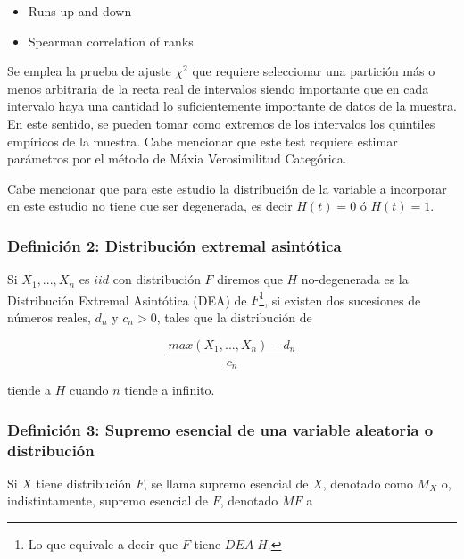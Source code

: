 \documentclass[
  12pt]{article}
\begin{document}
\begin{itemize}
\item  Runs up and down 
\item  Spearman correlation of ranks 
\end{itemize}

Se emplea la prueba de ajuste \(\chi^2\) que requiere seleccionar una
partición más o menos arbitraria de la recta real de intervalos siendo
importante que en cada intervalo haya una cantidad lo suficientemente
importante de datos de la muestra. En este sentido, se pueden tomar como
extremos de los intervalos los quintiles empíricos de la muestra. Cabe
mencionar que este test requiere estimar parámetros por el método de
Máxia Verosimilitud Categórica.

Cabe mencionar que para este estudio la distribución de la variable a
incorporar en este estudio no tiene que ser degenerada, es decir
\(H(t)=0\) ó \(H(t)=1\).

\newpage

\hypertarget{definiciuxf3n-2-distribuciuxf3n-extremal-asintuxf3tica}{%
\subsubsection{Definición 2: Distribución extremal
asintótica}\label{definiciuxf3n-2-distribuciuxf3n-extremal-asintuxf3tica}}

Si \(X_1,...,X_n\) es \(iid\) con distribución \(F\) diremos que \(H\)
no-degenerada es la Distribución Extremal Asintótica (DEA) de
\(F\)\footnote{Lo que equivale a decir que $F$ tiene $DEA\;H$.}, si
existen dos sucesiones de números reales, \(d_n\) y \(c_n>0\), tales que
la distribución de

\begin{equation}
\frac{max(X_1,...,X_n)- d_n}{c_n}\label{eq:max}
\end{equation}

tiende a \(H\) cuando \(n\) tiende a infinito.

\hypertarget{definiciuxf3n-3-supremo-esencial-de-una-variable-aleatoria-o-distribuciuxf3n}{%
\subsubsection{Definición 3: Supremo esencial de una variable aleatoria
o
distribución}\label{definiciuxf3n-3-supremo-esencial-de-una-variable-aleatoria-o-distribuciuxf3n}}

Si \(X\) tiene distribución \(F\), se llama supremo esencial de \(X\),
denotado como \(M_X\) o, indistintamente, supremo esencial de \(F\),
denotado \(MF\) a
\end{document}
